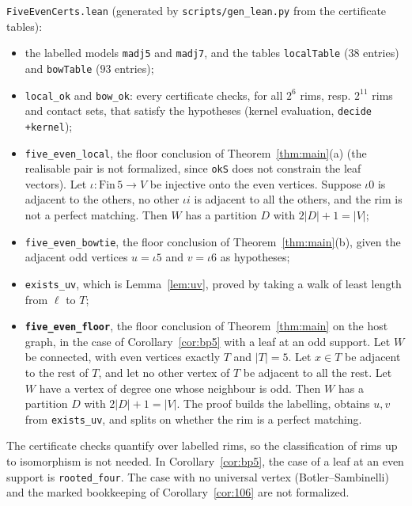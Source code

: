 \documentclass[11pt]{amsart}
\theoremstyle{definition}
\begin{document}
\texttt{FiveEvenCerts.lean} (generated by \texttt{scripts/gen\_lean.py} from the certificate tables):
\begin{itemize}
\item the labelled models \texttt{madj5} and \texttt{madj7}, and the tables \texttt{localTable}
($38$ entries) and \texttt{bowTable} ($93$ entries);
\item \texttt{local\_ok} and \texttt{bow\_ok}: every certificate checks, for all $2^6$ rims, resp.
$2^{11}$ rims and contact sets, that satisfy the hypotheses (kernel evaluation,
\texttt{decide +kernel});
\item \texttt{five\_even\_local}, the floor conclusion of Theorem~\ref{thm:main}(a) (the realisable
pair is not formalized, since \texttt{okS} does not constrain the leaf vectors). Let $\iota:\mathrm{Fin}\,5\to V$
be injective onto the even vertices. Suppose $\iota0$ is adjacent to the others, no other $\iota i$ is
adjacent to all the others, and the rim is not a perfect matching. Then $W$ has a partition $D$ with
$2|D|+1=|V|$;
\item \texttt{five\_even\_bowtie}, the floor conclusion of Theorem~\ref{thm:main}(b), given the adjacent odd
vertices $u=\iota5$ and $v=\iota6$ as hypotheses;
\item \texttt{exists\_uv}, which is Lemma~\ref{lem:uv}, proved by taking a walk of least length from
$\ell$ to $T$;
\item \textbf{\texttt{five\_even\_floor}}, the floor conclusion of Theorem~\ref{thm:main} on the host
graph, in the case of Corollary~\ref{cor:bp5} with a leaf at an odd support. Let $W$ be
connected, with even vertices exactly $T$ and $|T|=5$. Let $x\in T$ be adjacent to the rest of $T$,
and let no other vertex of $T$ be adjacent to all the rest. Let $W$ have a vertex of degree one whose
neighbour is odd. Then $W$ has a partition $D$ with $2|D|+1=|V|$. The proof builds the labelling,
obtains $u,v$ from \texttt{exists\_uv}, and splits on whether the rim is a perfect matching.
\end{itemize}

The certificate checks quantify over labelled rims, so the classification of rims up to isomorphism
is not needed. In Corollary~\ref{cor:bp5}, the case of a leaf at an even support is
\texttt{rooted\_four}. The case with no universal vertex (Botler--Sambinelli) and the marked
bookkeeping of Corollary~\ref{cor:106} are not formalized.
\end{document}
